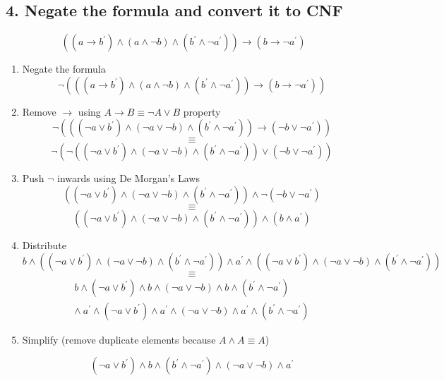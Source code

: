 \documentclass[a4paper, 14pt]{report}
\newcommand{\question}[1]{\subsection*{#1}}
\begin{document}
\question{4. Negate the formula and convert it to CNF} %

\[ ((a \rightarrow b^\prime) \wedge (a \wedge \neg b) \wedge (b^\prime \wedge \neg a^\prime)) \rightarrow (b \rightarrow \neg a^\prime) \]

\begin{enumerate}		

	\item Negate the formula \\
		\[ \neg (((a \rightarrow b^\prime) \wedge (a \wedge \neg b) \wedge (b^\prime \wedge \neg a^\prime)) \rightarrow (b \rightarrow \neg a^\prime)) \] 
	
	\item Remove $\rightarrow$ using $A \rightarrow B \equiv \neg A \vee B$ property \\
		\[ \neg (((\neg a \vee b^\prime) \wedge (\neg a \vee \neg b) \wedge (b^\prime \wedge \neg a^\prime)) \rightarrow (\neg b \vee \neg a^\prime)) \]  
		\[ \equiv \]
		\[ \neg (\neg ((\neg a \vee b^\prime) \wedge (\neg a \vee \neg b) \wedge (b^\prime \wedge \neg a^\prime)) \vee (\neg b \vee \neg a^\prime)) \] 

	\item Push $\neg$ inwards using De Morgan's Laws
		\[ ((\neg a \vee b^\prime) \wedge (\neg a \vee \neg b) \wedge (b^\prime \wedge \neg a^\prime)) \wedge \neg (\neg b \vee \neg a^\prime) \] 
		\[ \equiv \]
		\[ ((\neg a \vee b^\prime) \wedge (\neg a \vee \neg b) \wedge (b^\prime \wedge \neg a^\prime)) \wedge (b \wedge a^\prime) \] 

	\item Distribute
		\[ b \wedge ((\neg a \vee b^\prime) \wedge (\neg a \vee \neg b) \wedge (b^\prime \wedge \neg a^\prime)) \wedge a^\prime \wedge  ((\neg a \vee b^\prime) \wedge (\neg a \vee \neg b) \wedge (b^\prime \wedge \neg a^\prime)) \] 
		\[ \equiv \]
		\[ 
			\begin{split}
				b \wedge (\neg a \vee b^\prime) \wedge b \wedge (\neg a \vee \neg b) \wedge b \wedge (b^\prime \wedge \neg a^\prime) \\
				\wedge\  
				a^\prime \wedge (\neg a \vee b^\prime) \wedge a^\prime \wedge (\neg a \vee \neg b) \wedge a^\prime \wedge (b^\prime \wedge \neg a^\prime)
		 \end{split}
		\] 

		\item Simplify (remove duplicate elements because $ A \wedge A \equiv A$)

		\[ (\neg a \vee b^\prime) \wedge b \wedge (b^\prime \wedge \neg a^\prime) \wedge (\neg a \vee \neg b) \wedge a^\prime  \] 

\end{enumerate}		
\end{document}
